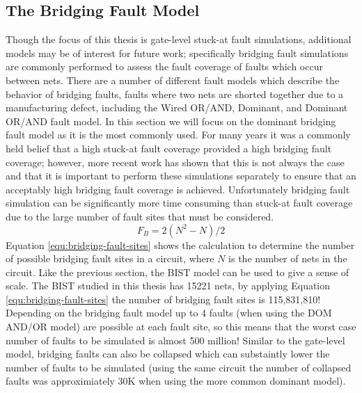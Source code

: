 \documentclass[12pt]{report}
\begin{document}
\subsection{The Bridging Fault Model}
\label{sct:bridgingfaults}
Though the focus of this thesis is gate-level stuck-at fault simulations, additional models may be of interest for future work; specifically bridging fault simulations are commonly performed to assess the fault coverage of faults which occur between nets.  There are a number of different fault models which describe the behavior of bridging faults, faults where two nets are shorted together due to a manufacturing defect, including the Wired OR/AND, Dominant, and Dominant OR/AND fault model\cite{stroud-bridging}.  In this section we will focus on the dominant bridging fault model as it is the most commonly used\cite{stroud}.  For many years it was a commonly held belief that a high stuck-at fault coverage provided a high bridging fault coverage; however, more recent work has shown that this is not always the case and that it is important to perform these simulations separately to ensure that an acceptably high bridging fault coverage is achieved\cite{stroud-bridging-physical}.  Unfortunately bridging fault simulation can be significantly more time consuming than stuck-at fault coverage due to the large number of fault sites that must be considered.
\begin{equation}
F_B = 2(N^2-N)/2
\label{equ:bridging-fault-sites}
\end{equation}
Equation \ref{equ:bridging-fault-sites} shows the calculation to determine the number of possible bridging fault sites in a circuit, where $N$ is the number of nets in the circuit\cite{stroud}.  Like the previous section, the BIST model can be used to give a sense of scale.  The BIST studied in this thesis has 15221 nets, by applying Equation \ref{equ:bridging-fault-sites} the number of bridging fault sites is 115,831,810!  Depending on the bridging fault model up to 4 faults (when using the DOM AND/OR model\cite{stroud-bridging}) are possible at each fault site, so this means that the worst case number of faults to be simulated is almost 500 million!  Similar to the gate-level model, bridging faults can also be collapsed which can substaintly lower the number of faults to be simulated (using the same circuit the number of collapsed faults was approximiately 30K when using the more common dominant model).
\end{document}
